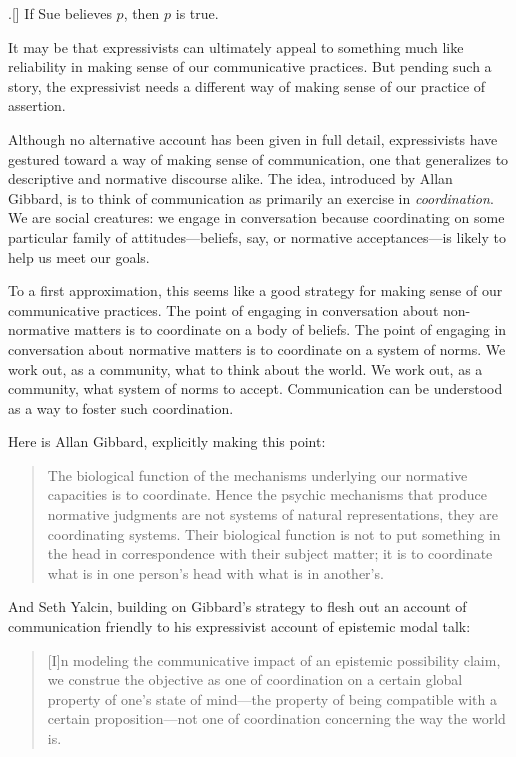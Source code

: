 \documentclass[11pt,article,oneside]{memoir}
\begin{document}
\ex.[] If Sue believes $p$, then $p$ is true.

It may be that expressivists can ultimately appeal to something much like reliability in making sense of our communicative practices. But pending such a story, the expressivist needs a different way of making sense of our practice of assertion. 

Although no alternative account has been given in full detail, expressivists have gestured toward a way of making sense of communication, one that generalizes to descriptive and normative discourse alike. The idea, introduced by Allan Gibbard, is to think of communication as primarily an exercise in \emph{coordination}. We are social creatures: we engage in conversation because coordinating on some particular family of attitudes---beliefs, say, or normative acceptances---is likely to help us meet our goals. 

To a first approximation, this seems like a good strategy for making sense of our communicative practices. The point of engaging in conversation about non-normative matters is to coordinate on a body of beliefs. The point of engaging in conversation about normative matters is to coordinate on a system of norms. We work out, as a community, what to think about the world. We work out, as a community, what system of norms to accept. Communication can be understood as a way to foster such coordination. 

Here is Allan Gibbard, explicitly making this point: 

\begin{small}
\begin{quote}
	The biological function of the mechanisms underlying our normative capacities is to coordinate. Hence the psychic mechanisms that produce normative judgments are not systems of natural representations, they are coordinating systems. Their biological function is not to put something in the head in correspondence with their subject matter; it is to coordinate what is in one person's head with what is in another's. \cite[p. 110]{gibbard1990}
\end{quote}
\end{small}
And Seth Yalcin, building on Gibbard's strategy to flesh out an account of communication friendly to his expressivist account of epistemic modal talk: 
\begin{small}
	\begin{quote}
[I]n modeling the communicative impact of an epistemic possibility claim, we construe the objective as one of coordination on a certain global property of one’s state of mind—the property of being compatible with a certain proposition—not one of coordination concerning the way the world is. \cite[p. 310]{yalcin2011}
	\end{quote}
\end{small}
\end{document}
